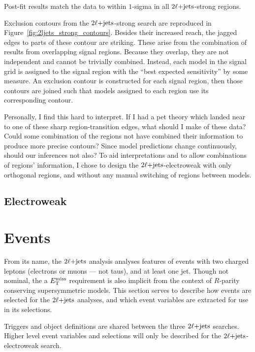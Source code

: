 Post-fit results match the data to within $1$-sigma in all $2\ell\mathrm{+jets}$-strong
regions.

Exclusion contours from the $2\ell\mathrm{+jets}$-strong search are reproduced in
Figure~\ref{fig:2ljets_strong_contours}.
Besides their increased reach, the jagged edges to parts of these contour are
striking.
These arise from the combination of results from overlapping signal regions.
Because they overlap, they are not independent and cannot be trivially
combined.
Instead, each model in the signal grid is assigned to the signal region
with the ``best expected sensitivity'' by some measure.
An exclusion contour is constructed for each signal region, then those contours
are joined such that models assigned to each region use its corresponding
contour.

Personally, I find this hard to interpret.
If I had a pet theory which landed near to one of these sharp
region-transition edges, what should I make of these data?
Could some combination of the regions not have combined their information to
produce more precise contours?
Since model predictions change continuously, should our inferences not also?
To aid interpretations and to allow combinations of regions'
information, I chose to design the $2\ell\mathrm{+jets}$-electroweak with only orthogonal
regions, and without any manual switching of regions between models.


\subsection{Electroweak}
\label{sec:2ljets_origins_electroweak}

\section{Events}
From its name, the $2\ell\mathrm{+jets}$ analysis analyses features of events with two
charged leptons (electrons or muons --- not taus), and at least one jet.
Though not nominal, the a $E_\mathrm{T}^\mathrm{miss}$ requirement is also implicit from the context
of $R$-parity conserving supersymmetric models.
This section serves to describe how events are selected for the $2\ell\mathrm{+jets}$
analyses, and which event variables are extracted for use in its selections.

Triggers and object definitions are shared between the three $2\ell\mathrm{+jets}$
searches.
Higher level event variables and selections will only be described for the
$2\ell\mathrm{+jets}$-electroweak search.



